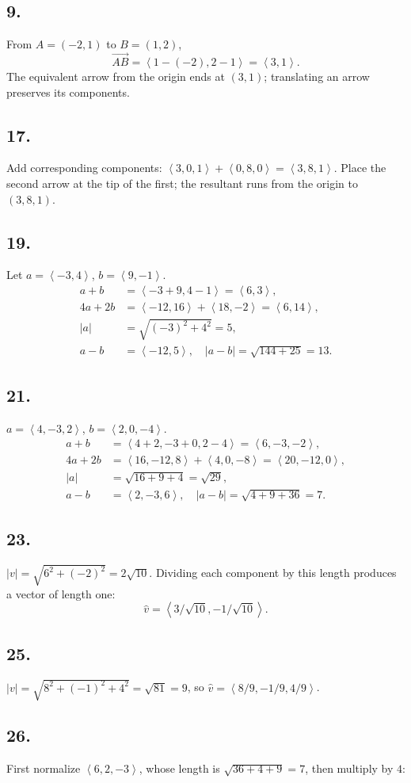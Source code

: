 \documentclass[11pt]{article}
\newcommand{\ex}[1]{\subsection*{#1.}}
\newcommand{\ans}[1]{\boxed{#1}}
\newcommand{\vv}[1]{\left\langle #1\right\rangle}
\begin{document}
\ex{9}
From $A=(-2,1)$ to $B=(1,2)$,
\[\overrightarrow{AB}=\vv{1-(-2),2-1}=\ans{\vv{3,1}}.\]
The equivalent arrow from the origin ends at $(3,1)$; translating an arrow preserves its components.
\begin{center}\end{center}
\ex{17}
Add corresponding components: $\vv{3,0,1}+\vv{0,8,0}=\ans{\vv{3,8,1}}$. Place the second arrow at the tip of the first; the resultant runs from the origin to $(3,8,1)$.
\begin{center}\end{center}
\ex{19}
Let $a=\vv{-3,4}$, $b=\vv{9,-1}$.
\begin{align*}a+b&=\vv{-3+9,4-1}=\ans{\vv{6,3}},\\4a+2b&=\vv{-12,16}+\vv{18,-2}=\ans{\vv{6,14}},\\|a|&=\sqrt{(-3)^2+4^2}=\ans5,\\a-b&=\vv{-12,5},\quad |a-b|=\sqrt{144+25}=\ans{13}.
\end{align*}
\ex{21}
$a=\vv{4,-3,2}$, $b=\vv{2,0,-4}$.
\begin{align*}a+b&=\vv{4+2,-3+0,2-4}=\ans{\vv{6,-3,-2}},\\4a+2b&=\vv{16,-12,8}+\vv{4,0,-8}=\ans{\vv{20,-12,0}},\\|a|&=\sqrt{16+9+4}=\ans{\sqrt{29}},\\a-b&=\vv{2,-3,6},\quad |a-b|=\sqrt{4+9+36}=\ans7.
\end{align*}
\ex{23}
$|v|=\sqrt{6^2+(-2)^2}=2\sqrt{10}$. Dividing each component by this length produces a vector of length one:
\[\ans{\widehat v=\vv{3/\sqrt{10},-1/\sqrt{10}}}.\]
\ex{25}
$|v|=\sqrt{8^2+(-1)^2+4^2}=\sqrt{81}=9$, so $\ans{\widehat v=\vv{8/9,-1/9,4/9}}$.
\ex{26}
First normalize $\vv{6,2,-3}$, whose length is $\sqrt{36+4+9}=7$, then multiply by $4$:
\end{document}
